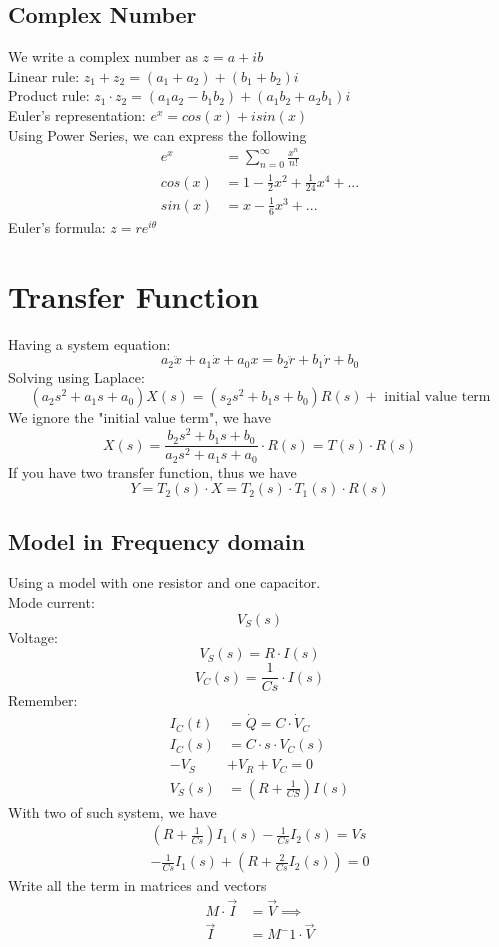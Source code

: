 \documentclass{article}
\begin{document}
\subsection{Complex Number}
We write a complex number as $ z = a + i b $ \\
Linear rule: $ z_1 + z_2 = (a_1 + a_2) + (b_1 + b_2)i $ \\
Product rule: $ z_1 \cdot z_2 = (a_1 a_2 - b_1 b_2) + (a_1 b_2 + a_2 b_1)i $ \\
Euler's representation: $ e^x = cos(x) + i sin(x) $ \\
Using Power Series, we can express the following
\begin{align*}
    e^x &= \sum_{n = 0}^{ \infty} \frac{x^n}{n!} \\
    cos(x) &= 1 - \frac{1}{2} x^2 + \frac{1}{24} x^4 + ... \\
    sin(x) &= x - \frac{1}{6} x^3 + ...
\end{align*}
Euler's formula: $ z = r e^{i \theta} $
\section{Transfer Function}
Having a system equation:
$$ a_2 \ddot x + a_1 \dot x + a_0 x = b_2 \ddot r + b_1 \dot r + b_0 $$
Solving using Laplace:
$$ (a_2 s^2 + a_1 s + a_0) X(s) = (s_2 s^2 + b_1 s + b_0) R(s) + \text{ initial value term} $$
We ignore the "initial value term", we have
$$ X(s) = \frac{b_2 s^2 + b_1 s + b_0}{a_2 s^2 + a_1 s + a_0} \cdot R(s) = T(s) \cdot R(s) $$
If you have two transfer function, thus we have
$$ Y = T_2(s) \cdot X = T_2(s) \cdot T_1(s) \cdot R(s) $$
\subsection{Model in Frequency domain}
Using a model with one resistor and one capacitor. \\
Mode current: $$ V_S(s) $$
Voltage: $$ V_S(s) = R \cdot I(s) $$
$$ V_C(s) = \frac{1}{C s} \cdot I(s) $$
Remember:
\begin{align*}
    I_C(t) &= \dot Q = C \cdot \dot V_C \\
    I_C(s) &= C \cdot s \cdot V_C(s) \\
    -V_S &+ V_R + V_C = 0 \\
    V_S(s) &= (R + \frac{1}{CS}) I(s)
\end{align*}
With two of such system, we have
\begin{align*}
    (R + \frac{1}{C s}) I_1(s) - \frac{1}{C s} I_2(s) = Vs \\
    - \frac{1}{C s} I_1(s) + (R + \frac{2}{C s} I_2(s)) = 0
\end{align*}
Write all the term in matrices and vectors
\begin{align*}
    M \cdot \vec{I} &= \vec{V} \implies \\
    \vec{I} &= M^-1 \cdot \vec{V}
\end{align*}
\end{document}
